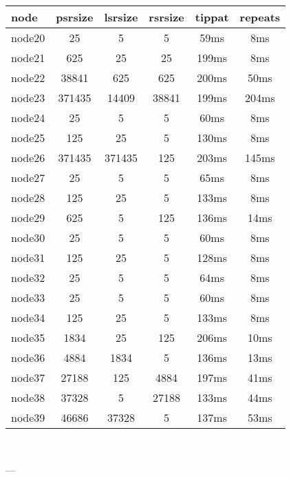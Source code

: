 \begin{tabular}{|l|c|c|c|c|c|}
\hline node & psrsize & lsrsize & rsrsize   & tippat & repeats\\
    \hline node20 & 25 & 5 & 5 & 59ms & 8ms\\
    \hline node21 & 625 & 25 & 25 & 199ms & 8ms\\
    \hline node22 & 38841 & 625 & 625 & 200ms & 50ms\\
    \hline node23 & 371435 & 14409 & 38841 & 199ms & 204ms\\
    \hline node24 & 25 & 5 & 5 & 60ms & 8ms\\
    \hline node25 & 125 & 25 & 5 & 130ms & 8ms\\
    \hline node26 & 371435 & 371435 & 125 & 203ms & 145ms\\
    \hline node27 & 25 & 5 & 5 & 65ms & 8ms\\
    \hline node28 & 125 & 25 & 5 & 133ms & 8ms\\
    \hline node29 & 625 & 5 & 125 & 136ms & 14ms\\
    \hline node30 & 25 & 5 & 5 & 60ms & 8ms\\
    \hline node31 & 125 & 25 & 5 & 128ms & 8ms\\
    \hline node32 & 25 & 5 & 5 & 64ms & 8ms\\
    \hline node33 & 25 & 5 & 5 & 60ms & 8ms\\
    \hline node34 & 125 & 25 & 5 & 133ms & 8ms\\
    \hline node35 & 1834 & 25 & 125 & 206ms & 10ms\\
    \hline node36 & 4884 & 1834 & 5 & 136ms & 13ms\\
    \hline node37 & 27188 & 125 & 4884 & 197ms & 41ms\\
    \hline node38 & 37328 & 5 & 27188 & 133ms & 44ms\\
    \hline node39 & 46686 & 37328 & 5 & 137ms & 53ms\\

\hline
\end{tabular} \

---


